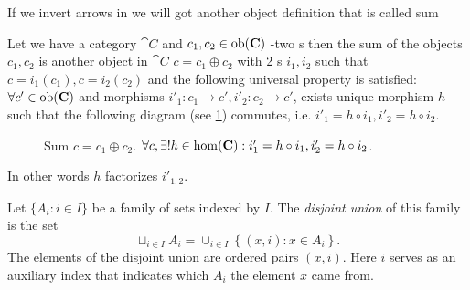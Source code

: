 If we invert arrows in  we will got another
object definition that is called sum

\begin{definition}[Sum]
\label{def:sum}
Let we have a category $\cat{C}$ and $c_1, c_2 \in \mathrm{ob}(\mathbf{C})$ -two
s then the sum of the objects $c_1, c_2$ is
another object in $\cat{C}$ $c = c_1 \oplus c_2$ with 2
s $i_1, i_2$ such that $c = i_1(c_1), c = i_2
(c_2)$ and the 
following universal property is satisfied: $\forall c' \in \mathrm{ob}(\mathbf{C})$
and morphisms $i'_1: c_1 \to c', i'_2: c_2 \to c'$, exists unique
morphism $h$ such that the following diagram (see \cref{fig:sum})
commutes, i.e. $i'_1 = h \circ i_1, i'_2 = h \circ i_2$.
\begin{figure}
  \centering
  \caption{Sum $c = c_1 \oplus c_2$. $\forall c, \exists! h \in
    \mathrm{hom}(\mathbf{C}): i'_1 = h \circ i_1, i'_2 = h \circ i_2 $.}
  \label{fig:sum}
\end{figure}
In other words $h$ factorizes $i'_{1,2}$.
\end{definition}

\begin{definition}
  \label{def:disjoint_union}
  Let $\{A_i: i \in I\}$ be a family of sets 
  indexed by $I$. The 
  \textit{disjoint union} \cite{wiki:disjointunion} of this family is
  the set 
  \[
  \sqcup_{i \in I} A_i = \cup_{i \in I}\left\{
  \left(x, i\right): x \in A_i
  \right\}.
  \]
  The elements of the disjoint union are ordered pairs $(x, i)$. Here $i$
  serves as an auxiliary index that indicates which $A_i$ the element $x$
  came from.
\end{definition}

